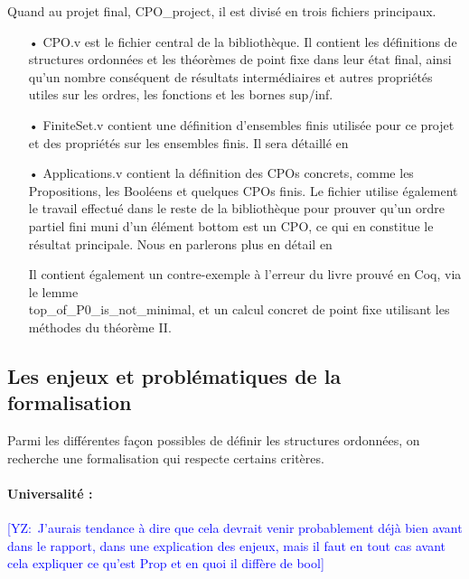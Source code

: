 \documentclass{article}
\newcommand{\yz}[1]{\textcolor{blue}{{[YZ:~#1]}}}
\newcommand\code[1]{{\fontfamily{lmtt}\selectfont #1}}
\theoremstyle{definition}
\begin{document}
\medskip

Quand au projet final, \code{CPO\_project}, il est divisé en trois fichiers principaux.

\medskip


\begin{itemize}
\item[•] \code{CPO.v} est le fichier central de la bibliothèque. Il contient les définitions de structures ordonnées et les théorèmes de point fixe dans leur état final, ainsi qu'un nombre conséquent de résultats intermédiaires et autres propriétés utiles sur les ordres, les fonctions et les bornes sup/inf. %
\item[•] \code{FiniteSet.v} contient une définition d'ensembles finis utilisée pour ce projet et des propriétés sur les ensembles finis. Il sera détaillé en %
\item[•] \code{Applications.v} contient la définition des CPOs concrets, comme les Propositions, les Booléens et quelques CPOs finis. Le fichier utilise également le travail effectué dans le reste de la bibliothèque pour prouver qu'un ordre partiel fini muni d'un élément bottom est un CPO, ce qui en constitue le résultat principale. Nous en parlerons plus en détail en %

Il contient également un contre-exemple à l'erreur du livre prouvé en Coq, via le lemme \\ \code{top\_of\_P0\_is\_not\_minimal}, et un calcul concret de point fixe utilisant les méthodes du théorème II.
\end{itemize}




\subsection{Les enjeux et problématiques de la formalisation}

Parmi les différentes façon possibles de définir les structures ordonnées, on recherche une formalisation qui respecte certains critères.

\paragraph{Universalité :\\}
\yz{J'aurais tendance à dire que cela devrait venir probablement déjà bien avant
dans le rapport, dans une explication des enjeux, mais il faut en tout cas avant
cela expliquer ce qu'est Prop et en quoi il diffère de bool}
\end{document}
